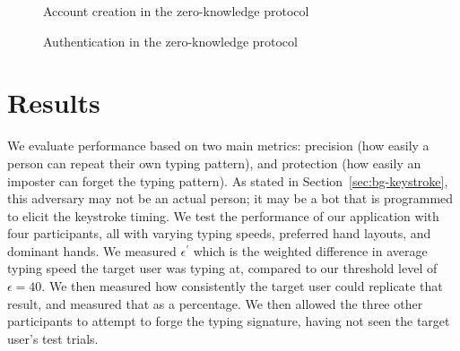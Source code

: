 \documentclass[11pt]{article}
\begin{document}
\begin{figure}
\centering
{}
\caption{Account creation in the zero-knowledge protocol}
\label{fig:zk_new}
\end{figure}

\begin{figure}
\centering
{}
\caption{Authentication in the zero-knowledge protocol}
\label{fig:zk_auth}
\end{figure}

\section{Results}
\label{sec:results}
We evaluate performance based on two main metrics: precision (how easily a person can repeat their own typing pattern), and protection (how easily an imposter can forget the typing pattern). As stated in Section~\ref{sec:bg-keystroke}, this adversary may not be an actual person; it may be a bot that is programmed to elicit the keystroke timing.  We test the performance of our application with four participants, all with varying typing speeds, preferred hand layouts, and dominant hands.  We measured $\epsilon^{'}$ which is the weighted difference in average typing speed the target user was typing at, compared to our threshold level of $\epsilon=40$. We then measured how consistently the target user could replicate that result, and measured that as a percentage. We then allowed the three other participants to attempt to forge the typing signature, having not seen the target user's test trials.
\end{document}
